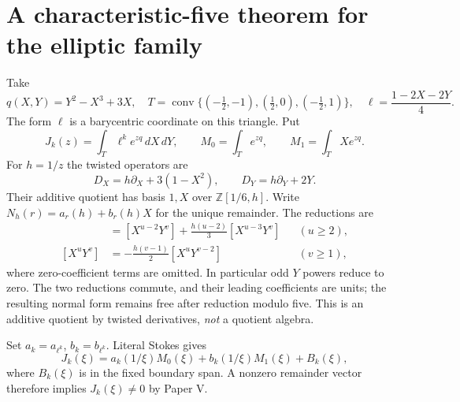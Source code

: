 \documentclass[11pt]{article}
\numberwithin{equation}{section}
\theoremstyle{definition}
\theoremstyle{remark}
\newcommand{\Z}{\mathbb Z}
\begin{document}
\section{A characteristic-five theorem for the elliptic family}
Take
\[
 q(X,Y)=Y^2-X^3+3X,
 \quad T=\operatorname{conv}\{(-\tfrac12,-1),(\tfrac12,0),(-\tfrac12,1)\},
 \quad \ell=\frac{1-2X-2Y}{4}.
\]
The form $\ell$ is a barycentric coordinate on this triangle. Put
\[
 J_k(z)=\int_T\ell^k e^{zq}\,dX\,dY,
 \qquad M_0=\int_Te^{zq},\qquad M_1=\int_TXe^{zq}.
\]
For $h=1/z$ the twisted operators are
\[
 D_X=h\partial_X+3(1-X^2),\qquad D_Y=h\partial_Y+2Y.
\]
Their additive quotient has basis $1,X$ over $\Z[1/6,h]$. Write
$N_h(r)=a_r(h)+b_r(h)X$ for the unique remainder. The reductions are
\begin{align}
 [X^uY^v]&=[X^{u-2}Y^v]+\frac{h(u-2)}3[X^{u-3}Y^v]
 &&(u\ge2),\label{eq:x-reduction}\\
 [X^uY^v]&=-\frac{h(v-1)}2[X^uY^{v-2}]
 &&(v\ge1),\label{eq:y-reduction}
\end{align}
where zero-coefficient terms are omitted. In particular odd $Y$ powers
reduce to zero. The two reductions commute, and their leading coefficients
are units; the resulting normal form remains free after reduction modulo
five. This is an additive quotient by twisted derivatives, \emph{not} a
quotient algebra.

Set $a_k=a_{\ell^k}$, $b_k=b_{\ell^k}$. Literal Stokes gives
\begin{equation}\label{eq:elliptic-remainder}
 J_k(\xi)=a_k(1/\xi)M_0(\xi)+b_k(1/\xi)M_1(\xi)+B_k(\xi),
\end{equation}
where $B_k(\xi)$ is in the fixed boundary span. A nonzero remainder vector
therefore implies $J_k(\xi)\ne0$ by Paper V.
\end{document}
